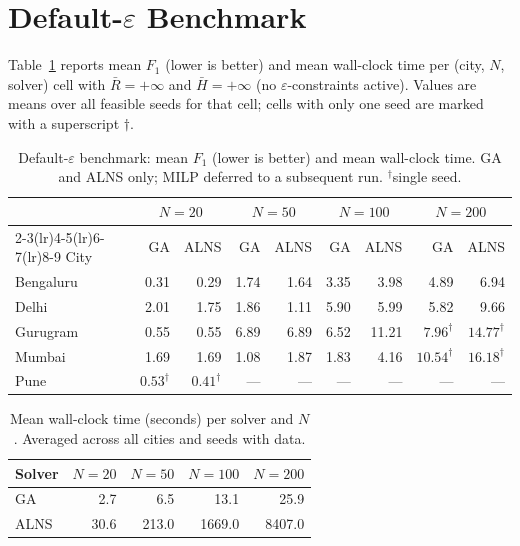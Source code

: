 \section{Default-$\varepsilon$ Benchmark}
\label{sec:default-eps}

Table~\ref{tab:default-grid} reports mean $F_1$ (lower is better) and
mean wall-clock time per (city, $N$, solver) cell with $\bar{R} =
+\infty$ and $\bar{H} = +\infty$ (no $\varepsilon$-constraints
active). Values are means over all feasible seeds for that cell;
cells with only one seed are marked with a superscript $\dagger$.

\begin{table}[ht]
\centering
\caption{Default-$\varepsilon$ benchmark: mean $F_1$ (lower is
better) and mean wall-clock time. GA and ALNS only; MILP deferred
to a subsequent run. $^\dagger$single seed.}
\label{tab:default-grid}
\small
\begin{tabular}{lrrrrrrrr}
\toprule
 & \multicolumn{2}{c}{$N=20$} & \multicolumn{2}{c}{$N=50$} &
   \multicolumn{2}{c}{$N=100$} & \multicolumn{2}{c}{$N=200$} \\
\cmidrule(lr){2-3}\cmidrule(lr){4-5}\cmidrule(lr){6-7}\cmidrule(lr){8-9}
City & GA & ALNS & GA & ALNS & GA & ALNS & GA & ALNS \\
\midrule
Bengaluru & 0.31 & 0.29 & 1.74 & 1.64 & 3.35 & 3.98 & 4.89 & 6.94 \\
Delhi     & 2.01 & 1.75 & 1.86 & 1.11 & 5.90 & 5.99 & 5.82 & 9.66 \\
Gurugram  & 0.55 & 0.55 & 6.89 & 6.89 & 6.52 & 11.21 & $7.96^\dagger$ & $14.77^\dagger$ \\
Mumbai    & 1.69 & 1.69 & 1.08 & 1.87 & 1.83 & 4.16 & $10.54^\dagger$ & $16.18^\dagger$ \\
Pune      & $0.53^\dagger$ & $0.41^\dagger$ & --- & --- & --- & --- & --- & --- \\
\bottomrule
\end{tabular}
\end{table}

\begin{table}[ht]
\centering
\caption{Mean wall-clock time (seconds) per solver and $N$.
Averaged across all cities and seeds with data.}
\label{tab:wall-clock}
\begin{tabular}{lrrrr}
\toprule
Solver & $N=20$ & $N=50$ & $N=100$ & $N=200$ \\
\midrule
GA   &   2.7 &   6.5 &  13.1 &   25.9 \\
ALNS &  30.6 & 213.0 & 1669.0 & 8407.0 \\
\bottomrule
\end{tabular}
\end{table}

